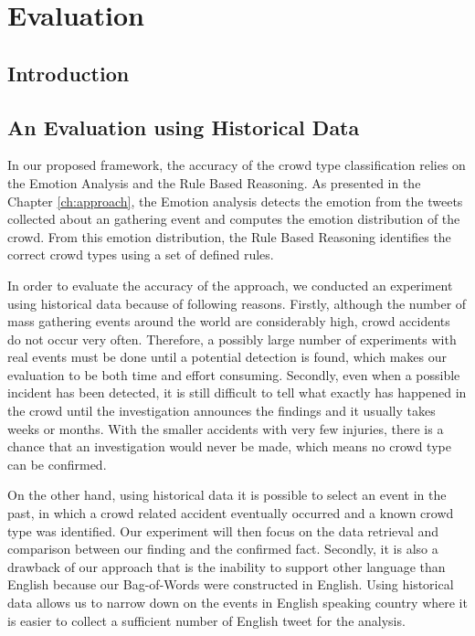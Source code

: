 \chapter{Evaluation}
\label{ch:eval}
\ifpdf
    \graphicspath{{Chapter5/Figs/Raster/}{Chapter5/Figs/PDF/}{Chapter5/Figs/}}
\else
    \graphicspath{{Chapter5/Figs/Vector/}{Chapter5/Figs/}}
\fi

\section{Introduction}

\section{An Evaluation using Historical Data}
In our proposed framework, the accuracy of the crowd type classification relies on the Emotion Analysis and the Rule Based Reasoning. As presented in the Chapter \ref{ch:approach}, the Emotion analysis detects the emotion from the tweets collected about an gathering event and computes the emotion distribution of the crowd. From this emotion distribution, the Rule Based Reasoning identifies the correct crowd types using a set of defined rules. 

In order to evaluate the accuracy of the approach, we conducted an experiment using historical data because of following reasons. Firstly, although the number of mass gathering events around the world are considerably high, crowd accidents do not occur very often. Therefore, a possibly large number of experiments with real events must be done until a potential detection is found, which makes our evaluation to be both time and effort consuming. Secondly, even when a possible incident has been detected, it is still difficult to tell what exactly has happened in the crowd until the investigation announces the findings and it usually takes weeks or months. With the smaller accidents with very few injuries, there is a chance that an investigation would never be made, which means no crowd type can be confirmed.

On the other hand, using historical data it is possible to select an event in the past, in which a crowd related accident eventually occurred and a known crowd type was identified. Our experiment will then focus on the data retrieval and comparison between our finding and the confirmed fact. Secondly, it is also a drawback of our approach that is the inability to support other language than English because our Bag-of-Words were constructed in English. Using historical data allows us to narrow down on the events in English speaking country where it is easier to collect a sufficient number of English tweet for the analysis.

